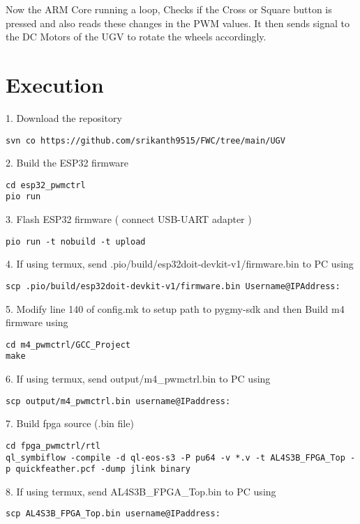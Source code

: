 \documentclass[journal,12pt,twocolumn]{IEEEtran}
\begin{document}
\vspace{0.25cm}

Now the ARM Core running a loop, Checks if the Cross or Square button is pressed and also reads these changes in the PWM values. It then sends signal to the DC Motors of the UGV to rotate the wheels accordingly.\\

\section{Execution}
\raggedright
1. Download the repository

\begin{lstlisting}
svn co https://github.com/srikanth9515/FWC/tree/main/UGV
\end{lstlisting}

2. Build the ESP32 firmware
\begin{lstlisting}
cd esp32_pwmctrl
pio run
\end{lstlisting} 

3. Flash ESP32 firmware ( connect USB-UART adapter )
\begin{lstlisting}
pio run -t nobuild -t upload
\end{lstlisting} 

4. If using termux, send .pio/build/esp32doit-devkit-v1/firmware.bin to PC using
\begin{lstlisting}
scp .pio/build/esp32doit-devkit-v1/firmware.bin Username@IPAddress:
\end{lstlisting} 

5.  Modify line 140 of config.mk to setup path to pygmy-sdk and then Build m4 firmware using
\begin{lstlisting}
cd m4_pwmctrl/GCC_Project
make
\end{lstlisting}

6. If using termux, send output/m4{\_}pwmctrl.bin to PC using
\begin{lstlisting}
scp output/m4_pwmctrl.bin username@IPaddress:
\end{lstlisting} 

7. Build fpga source (.bin file)
\begin{lstlisting}
cd fpga_pwmctrl/rtl
ql_symbiflow -compile -d ql-eos-s3 -P pu64 -v *.v -t AL4S3B_FPGA_Top -p quickfeather.pcf -dump jlink binary 
\end{lstlisting} 

8. If using termux, send AL4S3B{\_}FPGA{\_}Top.bin to PC using
\begin{lstlisting}
scp AL4S3B_FPGA_Top.bin username@IPaddress:
\end{lstlisting} 
\end{document}
